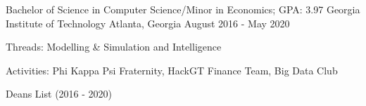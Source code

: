 \documentclass[
    changecolor={0, 38, 58},
]{pranav-resume}
\begin{document}
\pagestyle{empty} %


\cventry
  {Bachelor of Science in Computer Science/Minor in Economics; GPA: 3.97}
  {Georgia Institute of Technology}
  {Atlanta, Georgia}
  {August 2016 - May 2020}
  {
    \begin{cvitems}
      \item {Threads: Modelling \& Simulation and Intelligence}
      \item {Activities: Phi Kappa Psi Fraternity, HackGT Finance Team, Big Data Club}
      \item {Deans List (2016 - 2020)}
    \end{cvitems}
  }
\end{document}
